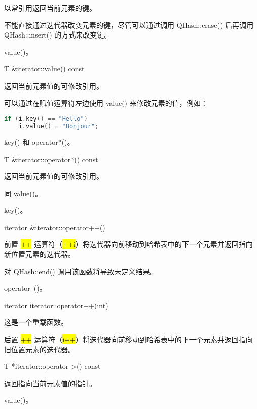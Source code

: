 以常引用返回当前元素的键。

不能直接通过迭代器改变元素的键，尽管可以通过调用 QHash::erase() 后再调用 QHash::insert() 的方式来改变键。


\begin{seeAlso}
 value()。
\end{seeAlso}

T \&iterator::value() const

返回当前元素值的可修改引用。

可以通过在赋值运算符左边使用 value() 来修改元素的值，例如：

\begin{lstlisting}[language=C++]
if (i.key() == "Hello")
    i.value() = "Bonjour";
\end{lstlisting}


\begin{seeAlso}
key() 和 operator*()。
\end{seeAlso}

T \&iterator::operator*() const

返回当前元素值的可修改引用。

同 value()。


\begin{seeAlso}
key()。
\end{seeAlso}


iterator \&iterator::operator++()

前置 \hl{++} 运算符（\hl{++i}）将迭代器向前移动到哈希表中的下一个元素并返回指向新位置元素的迭代器。

对 QHash::end() 调用该函数将导致未定义结果。


\begin{seeAlso}
operator--()。
\end{seeAlso}

iterator iterator::operator++(int)

这是一个重载函数。

后置 \hl{++} 运算符（\hl{i++}）将迭代器向前移动到哈希表中的下一个元素并返回指向旧位置元素的迭代器。

T *iterator::operator->() const

返回指向当前元素值的指针。

\begin{seeAlso}
 value()。
\end{seeAlso}
